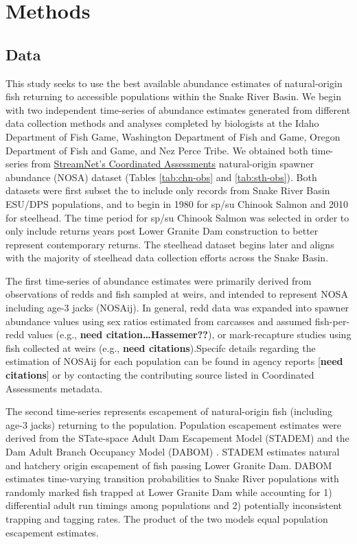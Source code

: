 \documentclass[12pt,a4paper]{article}
\begin{document}
\section{Methods}\label{methods}

\subsection{Data}\label{data}

This study seeks to use the best available abundance estimates of natural-origin fish returning to accessible populations within the Snake River Basin. We begin with two independent time-series of abundance estimates generated from different data collection methods and analyses completed by biologists at the Idaho Department of Fish Game, Washington Department of Fish and Game, Oregon Department of Fish and Game, and Nez Perce Tribe. We obtained both time-series from \href{https://cax.streamnet.org}{StreamNet's Coordinated Assessments} natural-origin spawner abundance (NOSA) dataset (Tables \ref{tab:chn-obs} and \ref{tab:sth-obs}). Both datasets were first subset the to include only records from Snake River Basin ESU/DPS populations, and to begin in 1980 for sp/su Chinook Salmon and 2010 for steelhead. The time period for sp/su Chinook Salmon was selected in order to only include returns years post Lower Granite Dam construction to better represent contemporary returns. The steelhead dataset begins later and aligns with the majority of steelhead data collection efforts across the Snake Basin.

The first time-series of abundance estimates were primarily derived from observations of redds and fish sampled at weirs, and intended to represent NOSA including age-3 jacks (NOSAij). In general, redd data was expanded into spawner abundance values using sex ratios estimated from carcasses and assumed fish-per-redd values (e.g., \textbf{need citation\ldots Hassemer??}), or mark-recapture studies using fish collected at weirs (e.g., \textbf{need citations}).Specifc details regarding the estimation of NOSAij for each population can be found in agency reports {[}\textbf{need citations}{]} or by contacting the contributing source listed in Coordinated Assessments metadata.

The second time-series represents escapement of natural-origin fish (including age-3 jacks) returning to the population. Population escapement estimates were derived from the STate-space Adult Dam Escapement Model (STADEM) \autocite{see_state-space_2021} and the Dam Adult Branch Occupancy Model (DABOM) \autocite{waterhouse_bayesian_2020,see_pit_2016,kinzer_snake_2020}. STADEM estimates natural and hatchery origin escapement of fish passing Lower Granite Dam. DABOM estimates time-varying transition probabilities to Snake River populations with randomly marked fish trapped at Lower Granite Dam while accounting for 1) differential adult run timings among populations and 2) potentially inconsistent trapping and tagging rates. The product of the two models equal population escapement estimates.
\end{document}
